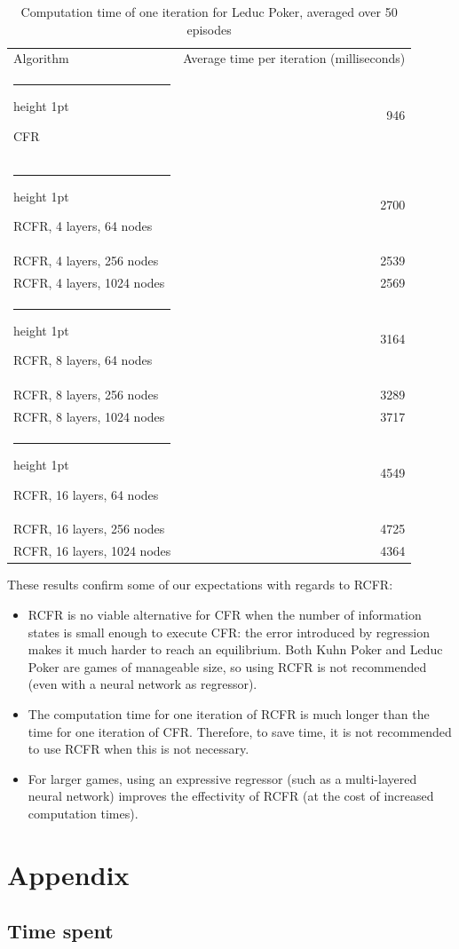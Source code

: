 \documentclass[10pt,a4paper]{article}
\makeatletter
\newcommand{\thickhline}{%
    \noalign {\ifnum 0=`}\fi \hrule height 1pt
    \futurelet \reserved@a \@xhline
}
\makeatother
\begin{document}
\FloatBarrier
\begin{table}
	\centering
	\begin{tabular}{|l|r|}
	\hline
	Algorithm & Average time per iteration (milliseconds)\\
	\thickhline
	CFR & 946 \\
	\thickhline
	RCFR, 4 layers, 64 nodes& 2700 \\
	\hline
	RCFR, 4 layers, 256 nodes & 2539 \\
	\hline
	RCFR, 4 layers, 1024 nodes & 2569 \\
	\thickhline
	RCFR, 8 layers, 64 nodes & 3164 \\
	\hline
	RCFR, 8 layers, 256 nodes  & 3289 \\
	\hline
	RCFR, 8 layers, 1024 nodes  & 3717 \\
	\thickhline
	RCFR, 16 layers, 64 nodes & 4549 \\
	\hline
	RCFR, 16 layers, 256 nodes & 4725 \\
	\hline
	RCFR, 16 layers, 1024 nodes & 4364 \\
	\hline
	\end{tabular}
	\caption{Computation time of one iteration for Leduc Poker, averaged over 50 episodes}
	\label{tbl:leduc_times}
\end{table}
\FloatBarrier

These results confirm some of our expectations with regards to RCFR:
\begin{itemize}
\item{RCFR is no viable alternative for CFR when the number of information states is small enough to execute CFR: the error introduced by regression makes it much harder to reach an equilibrium. Both Kuhn Poker and Leduc Poker are games of manageable size, so using RCFR is not recommended (even with a neural network as regressor).}
\item{The computation time for one iteration of RCFR is much longer than the time for one iteration of CFR. Therefore, to save time, it is not recommended to use RCFR when this is not necessary.}
\item{For larger games, using an expressive regressor (such as a multi-layered neural network) improves the effectivity of RCFR (at the cost of increased computation times).}
\end{itemize}





\section*{Appendix}
\subsection{Time spent}
\end{document}
